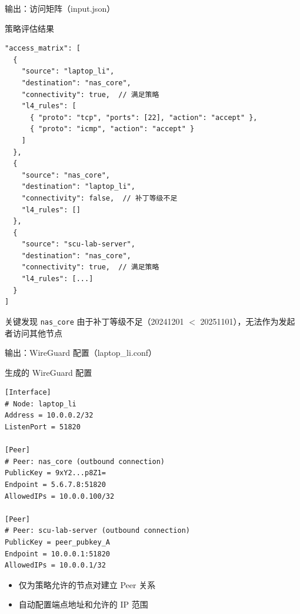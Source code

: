 \documentclass[aspectratio=169, 10pt]{beamer}
\begin{document}
\begin{frame}[fragile]{输出：访问矩阵（input.json）}
    \begin{block}{策略评估结果}
        \lstset{language=json, basicstyle=\tiny\ttfamily}
        \begin{lstlisting}
"access_matrix": [
  {
    "source": "laptop_li",
    "destination": "nas_core",
    "connectivity": true,  // 满足策略
    "l4_rules": [
      { "proto": "tcp", "ports": [22], "action": "accept" },
      { "proto": "icmp", "action": "accept" }
    ]
  },
  {
    "source": "nas_core",
    "destination": "laptop_li",
    "connectivity": false,  // 补丁等级不足
    "l4_rules": []
  },
  {
    "source": "scu-lab-server",
    "destination": "nas_core",
    "connectivity": true,  // 满足策略
    "l4_rules": [...]
  }
]
        \end{lstlisting}
    \end{block}
    
    \begin{alertblock}{关键发现}
        \texttt{nas\_core} 由于补丁等级不足（20241201 $<$ 20251101），无法作为发起者访问其他节点
    \end{alertblock}
\end{frame}

\begin{frame}[fragile]{输出：WireGuard 配置（laptop\_li.conf）}
    \begin{block}{生成的 WireGuard 配置}
        \lstset{language=bash, basicstyle=\small\ttfamily}
        \begin{lstlisting}
[Interface]
# Node: laptop_li
Address = 10.0.0.2/32
ListenPort = 51820

[Peer]
# Peer: nas_core (outbound connection)
PublicKey = 9xY2...p8Z1=
Endpoint = 5.6.7.8:51820
AllowedIPs = 10.0.0.100/32

[Peer]
# Peer: scu-lab-server (outbound connection)
PublicKey = peer_pubkey_A
Endpoint = 10.0.0.1:51820
AllowedIPs = 10.0.0.1/32
        \end{lstlisting}
    \end{block}
    
    \begin{itemize}
        \item 仅为策略允许的节点对建立 Peer 关系
        \item 自动配置端点地址和允许的 IP 范围
    \end{itemize}
\end{frame}
\end{document}
